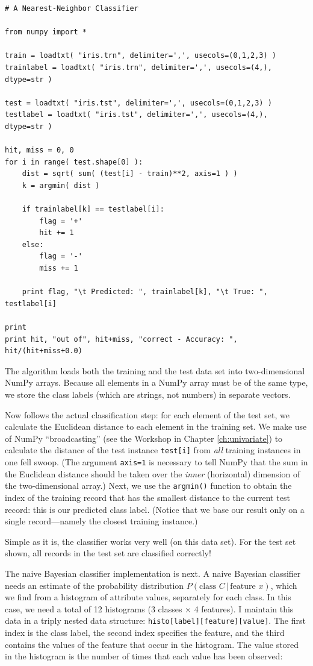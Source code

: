 \begin{verbatim}
# A Nearest-Neighbor Classifier

from numpy import *

train = loadtxt( "iris.trn", delimiter=',', usecols=(0,1,2,3) )
trainlabel = loadtxt( "iris.trn", delimiter=',', usecols=(4,), dtype=str )

test = loadtxt( "iris.tst", delimiter=',', usecols=(0,1,2,3) )
testlabel = loadtxt( "iris.tst", delimiter=',', usecols=(4,), dtype=str )

hit, miss = 0, 0
for i in range( test.shape[0] ):
    dist = sqrt( sum( (test[i] - train)**2, axis=1 ) )
    k = argmin( dist )

    if trainlabel[k] == testlabel[i]:
        flag = '+'
        hit += 1
    else:
        flag = '-'
        miss += 1
        
    print flag, "\t Predicted: ", trainlabel[k], "\t True: ", testlabel[i]

print
print hit, "out of", hit+miss, "correct - Accuracy: ", hit/(hit+miss+0.0)
\end{verbatim}

The algorithm loads both the training and the test data set into
two-dimensional NumPy arrays. Because all elements in a NumPy array
must be of the same type, we store the class labels (which are
strings, not numbers) in separate vectors.

Now follows the actual classification step: for each element of the
test set, we calculate the Euclidean distance to each element in the
training set. We make use of NumPy ``broadcasting'' (see the Workshop
in Chapter \ref{ch:univariate}) to calculate the distance of the test
instance \texttt{test[i]} from \emph{all} training instances in one
fell swoop. (The argument \texttt{axis=1} is necessary to tell NumPy
that the sum in the Euclidean distance should be taken over the
\emph{inner} (horizontal) dimension of the two-dimensional array.)
Next, we use the \texttt{argmin()} function to obtain the index of the
training record that has the smallest distance to the current test
record: this is our predicted class label. (Notice that we base our
result only on a single record---namely the closest training
instance.)

Simple as it is, the classifier works very well (on this data set).
For the test set shown, all records in the test set are classified
correctly!

The naive Bayesian classifier implementation is next. A naive Bayesian
classifier needs an estimate of the probability distribution $P(
\text{class $C$} \, | \, \text{feature $x$} )$,  which we find from a
histogram of attribute values, separately for each class. In this
case, we need a total of 12 histograms (3 classes $\times$ 4
features). I maintain this data in a triply nested data structure:
\texttt{histo[label][feature][value]}.  The first index is the class
label, the\vadjust{\pagebreak} second index specifies the feature, and the third contains
the values of the feature that occur in the histogram. The value
stored in the histogram is the number of times that each value has
been observed:  \leaflong{18pt}

